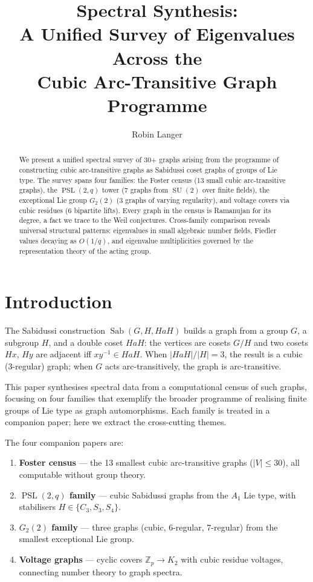 \documentclass[11pt,a4paper]{article}
\title{Spectral Synthesis:\\
  A Unified Survey of Eigenvalues Across the\\
  Cubic Arc-Transitive Graph Programme}
\author{Robin Langer}
\date{}
\theoremstyle{plain}
\theoremstyle{definition}
\theoremstyle{remark}
\newcommand{\Z}{\mathbb{Z}}
\newcommand{\PSL}{\operatorname{PSL}}
\newcommand{\SU}{\operatorname{SU}}
\newcommand{\Sab}{\operatorname{Sab}}
\begin{document}
\maketitle

\begin{abstract}
We present a unified spectral survey of 30+ graphs arising from the
programme of constructing cubic arc-transitive graphs as Sabidussi
coset graphs of groups of Lie type. The survey spans four families:
the Foster census (13 small cubic arc-transitive graphs), the
$\PSL(2,q)$ tower (7 graphs from $\SU(2)$ over finite fields),
the exceptional Lie group $G_2(2)$ (3 graphs of varying regularity),
and voltage covers via cubic residues (6 bipartite lifts).
Every graph in the census is Ramanujan for its degree,
a fact we trace to the Weil conjectures.
Cross-family comparison reveals universal structural patterns:
eigenvalues in small algebraic number fields,
Fiedler values decaying as $O(1/q)$, and eigenvalue multiplicities
governed by the representation theory of the acting group.
\end{abstract}


\section{Introduction}

The Sabidussi construction $\Sab(G, H, HaH)$ builds a graph from a group
$G$, a subgroup $H$, and a double coset $HaH$: the vertices are cosets
$G/H$ and two cosets $Hx$, $Hy$ are adjacent iff $xy^{-1} \in HaH$. When
$|HaH|/|H| = 3$, the result is a cubic (3-regular) graph; when $G$ acts
arc-transitively, the graph is arc-transitive.

This paper synthesises spectral data from a computational census of such
graphs, focusing on four families that exemplify the broader programme of
realising finite groups of Lie type as graph automorphisms.
Each family is treated in a companion paper; here we extract the
cross-cutting themes.

The four companion papers are:
\begin{enumerate}
\item \textbf{Foster census} --- the 13 smallest cubic arc-transitive
  graphs ($|V| \le 30$), all computable without group theory.
\item \textbf{$\PSL(2,q)$ family} --- cubic Sabidussi graphs from the
  $A_1$ Lie type, with stabilisers $H \in \{C_3, S_3, S_4\}$.
\item \textbf{$G_2(2)$ family} --- three graphs (cubic, 6-regular,
  7-regular) from the smallest exceptional Lie group.
\item \textbf{Voltage graphs} --- cyclic covers $\Z_p \to K_2$ with cubic
  residue voltages, connecting number theory to graph spectra.
\end{enumerate}
\end{document}

